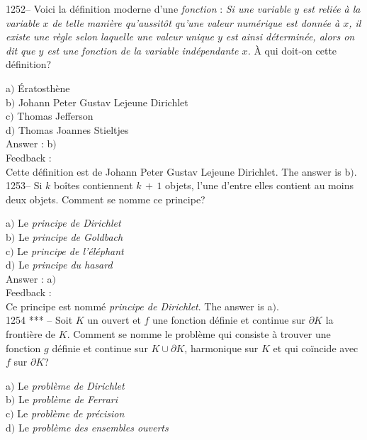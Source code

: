 ﻿\documentclass[letterpaper, 12pt]{article}
\begin{document}
1252-- Voici la d\'efinition moderne d'une {\sl fonction} : {\sl Si
une variable $y$ est reli\'ee \`a la variable $x$ de telle mani\`ere
qu'aussit\^ot qu'une valeur num\'erique est donn\'ee \`a $x$, il
existe une r\`egle selon laquelle une valeur unique $y$ est ainsi
d\'etermin\'ee, alors on dit que $y$ est une fonction de la variable
ind\'ependante $x$.} \`A qui doit-on cette d\'efinition?

a$)$ \'Eratosth\`ene \\
b$)$ Johann Peter Gustav Lejeune Dirichlet \\
c$)$ Thomas Jefferson \\
d$)$ Thomas Joannes Stieltjes\\

Answer : b$)$\\

Feedback : \\
Cette d\'efinition est de Johann Peter Gustav Lejeune Dirichlet.
The answer is b$)$.\\

1253-- Si $k$ bo\^ites contiennent $k\,+\,1$ objets, l'une d'entre
elles contient au moins deux objets. Comment se nomme ce principe?

a$)$ Le {\sl principe de Dirichlet} \\
b$)$ Le {\sl principe de Goldbach} \\
c$)$ Le {\sl principe de l'\'el\'ephant} \\
d$)$ Le {\sl principe du hasard}\\

Answer : a$)$\\

Feedback : \\
Ce principe est nomm\'e {\sl principe de Dirichlet}.
The answer is a$)$.\\

1254 *** -- Soit $K$ un ouvert et $f$ une fonction d\'efinie et
continue sur $\partial K$  la fronti\`ere de $K$. Comment se nomme
le probl\`eme qui consiste \`a trouver une fonction $g$ d\'efinie et
continue sur $K\cup\partial K$, harmonique sur $K$ et qui co\"incide
avec $f$ sur $\partial K$?

a$)$ Le {\sl probl\`eme de Dirichlet} \\
b$)$ Le {\sl probl\`eme de Ferrari} \\
c$)$ Le {\sl probl\`eme de pr\'ecision} \\
d$)$ Le {\sl probl\`eme des ensembles ouverts}\\
\end{document}
